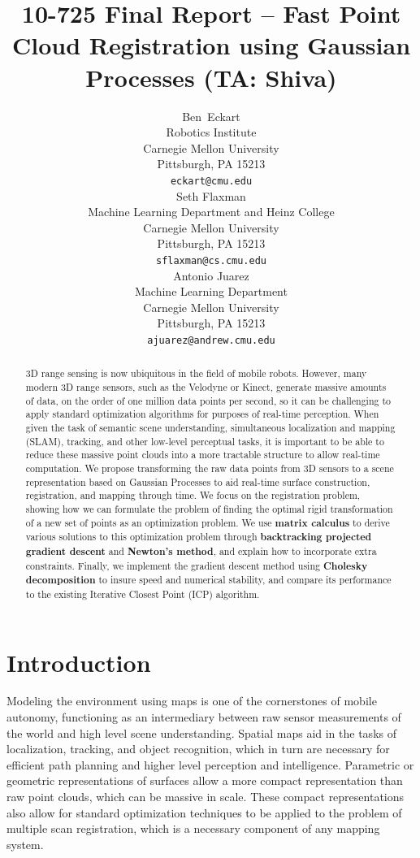 \documentclass{article} %
\title{10-725 Final Report -- Fast Point Cloud Registration using Gaussian Processes (TA: Shiva)}
\author{
Ben~Eckart\\
Robotics Institute\\
Carnegie Mellon University\\
Pittsburgh, PA 15213 \\
\texttt{eckart@cmu.edu} \\
\And
Seth Flaxman \\
Machine Learning Department and Heinz College\\
Carnegie Mellon University\\
Pittsburgh, PA 15213 \\
\texttt{sflaxman@cs.cmu.edu} \\
\And
Antonio Juarez \\
Machine Learning Department\\
Carnegie Mellon University\\
Pittsburgh, PA 15213 \\
\texttt{ajuarez@andrew.cmu.edu} \\
}
\begin{document}
\maketitle

\begin{abstract}

3D range sensing is now ubiquitous in the field of mobile robots. However, many modern 3D range sensors, such as the Velodyne or Kinect, generate massive amounts of data, on the order of one million data points per second,  so it can be challenging to apply standard optimization algorithms for purposes of real-time perception. When given the task of semantic scene understanding, simultaneous localization and mapping (SLAM), tracking, and other low-level perceptual tasks, it is important to be able to reduce these massive point clouds into a more tractable structure to allow real-time computation. We propose transforming the raw data points from 3D sensors to a scene representation based on Gaussian Processes to aid real-time surface construction, registration, and mapping through time. We focus on the registration problem, showing how we can formulate the problem of finding the optimal rigid transformation of a new set of points as an optimization problem. We use {\bf matrix calculus} to derive various solutions to this optimization problem through {\bf backtracking projected gradient descent} and {\bf Newton's method}, and explain how to incorporate extra constraints. Finally, we implement the gradient descent method using {\bf Cholesky decomposition} to insure speed and numerical stability, and compare its performance to the existing Iterative Closest Point (ICP) algorithm.

\end{abstract}

\section{Introduction}

Modeling the environment using maps is one of the cornerstones of mobile autonomy, functioning as an intermediary between raw sensor measurements of the world and high level scene understanding. Spatial maps aid in the tasks of localization, tracking, and object recognition, which in turn are necessary for efficient path planning and higher level perception and intelligence. Parametric or geometric representations of surfaces allow a more compact representation than raw point clouds, which can be massive in scale. These compact representations also allow for standard optimization techniques to be applied to the problem of multiple scan registration, which is a necessary component of any mapping system.
\end{document}
